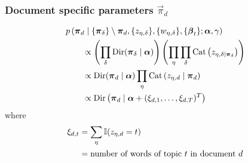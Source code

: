 \subsubsection{Document specific parameters $\vec \pi_d$}
\begin{align}
    \hspace{2em}&\hspace{-2em}
    p\left(\vec \pi_d \given \{\vec \pi_\delta\} \setminus \vec \pi_d, \{z_{\eta, \delta}\}, \{w_{\eta, \delta}\}, \{\vec \beta_t\}; \vec \alpha, \gamma\right) \nonumber\\
    &\propto \left(\prod_\delta \Dir(\vec \pi_\delta \given \vec \alpha)\right)\left(\prod_\eta \prod_\delta \Cat\left(z_{\eta, \delta \given \vec \pi_\delta}\right)\right) \nonumber\\
    &\propto \Dir(\vec \pi_d \given \vec \alpha) \prod_\eta \Cat\left(z_{\eta, d} \given \vec \pi_d\right) \nonumber\\
    &\propto \Dir\left(\vec \pi_d \given \vec \alpha + (\xi_{d, 1}, \dotsc, \xi_{d, T})^T\right)
\end{align}
where
\begin{align}
    \xi_{d, t}       &= \sum_\eta \operatorname{\mathbb I}(z_{\eta, d} = t) \label{eqn:models/lda/gibbs/xi} \\
                    &= \text{number of words of topic $t$ in document $d$} \nonumber
\end{align}

